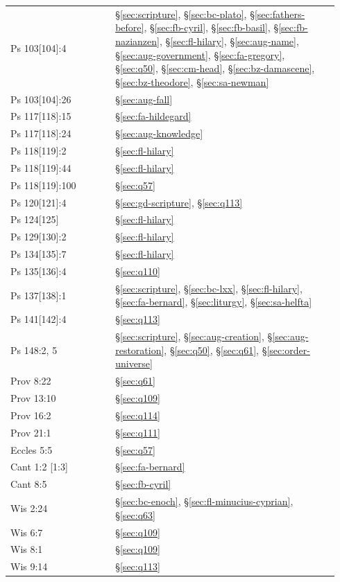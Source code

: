 \begin{longtable}{>{\raggedright\arraybackslash}p{0.30\linewidth}>{\raggedright\arraybackslash}p{0.64\linewidth}}
Ps 103[104]:4 & \S\ref{sec:scripture}, \S\ref{sec:bc-plato}, \S\ref{sec:fathers-before}, \S\ref{sec:fb-cyril}, \S\ref{sec:fb-basil}, \S\ref{sec:fb-nazianzen}, \S\ref{sec:fl-hilary}, \S\ref{sec:aug-name}, \S\ref{sec:aug-government}, \S\ref{sec:fa-gregory}, \S\ref{sec:q50}, \S\ref{sec:cm-head}, \S\ref{sec:bz-damascene}, \S\ref{sec:bz-theodore}, \S\ref{sec:sa-newman}\\
Ps 103[104]:26 & \S\ref{sec:aug-fall}\\
Ps 117[118]:15 & \S\ref{sec:fa-hildegard}\\
Ps 117[118]:24 & \S\ref{sec:aug-knowledge}\\
Ps 118[119]:2 & \S\ref{sec:fl-hilary}\\
Ps 118[119]:44 & \S\ref{sec:fl-hilary}\\
Ps 118[119]:100 & \S\ref{sec:q57}\\
Ps 120[121]:4 & \S\ref{sec:gd-scripture}, \S\ref{sec:q113}\\
Ps 124[125] & \S\ref{sec:fl-hilary}\\
Ps 129[130]:2 & \S\ref{sec:fl-hilary}\\
Ps 134[135]:7 & \S\ref{sec:fl-hilary}\\
Ps 135[136]:4 & \S\ref{sec:q110}\\
Ps 137[138]:1 & \S\ref{sec:scripture}, \S\ref{sec:bc-lxx}, \S\ref{sec:fl-hilary}, \S\ref{sec:fa-bernard}, \S\ref{sec:liturgy}, \S\ref{sec:sa-helfta}\\
Ps 141[142]:4 & \S\ref{sec:q113}\\
Ps 148:2, 5 & \S\ref{sec:scripture}, \S\ref{sec:aug-creation}, \S\ref{sec:aug-restoration}, \S\ref{sec:q50}, \S\ref{sec:q61}, \S\ref{sec:order-universe}\\
Prov 8:22 & \S\ref{sec:q61}\\
Prov 13:10 & \S\ref{sec:q109}\\
Prov 16:2 & \S\ref{sec:q114}\\
Prov 21:1 & \S\ref{sec:q111}\\
Eccles 5:5 & \S\ref{sec:q57}\\
Cant 1:2 [1:3] & \S\ref{sec:fa-bernard}\\
Cant 8:5 & \S\ref{sec:fb-cyril}\\
Wis 2:24 & \S\ref{sec:bc-enoch}, \S\ref{sec:fl-minucius-cyprian}, \S\ref{sec:q63}\\
Wis 6:7 & \S\ref{sec:q109}\\
Wis 8:1 & \S\ref{sec:q109}\\
Wis 9:14 & \S\ref{sec:q113}\\

\end{longtable}
